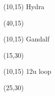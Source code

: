 \documentclass[11pt,a4paper]{beamer}
\begin{document}
\begin{frame}

  \begin{textblock}{60}(10,15)
    {\huge Hydra}
  \end{textblock}

  \begin{textblock}{20}(40,15)
  \end{textblock}
\end{frame}

\begin{frame}

  \begin{textblock}{60}(10,15)
    {\huge Gandalf}
  \end{textblock}

  \begin{textblock}{20}(15,30)
  \end{textblock}
\end{frame}

\begin{frame}
  \begin{textblock}{60}(10,15)
    {\huge 12u loop}
  \end{textblock}
  \begin{textblock}{20}(25,30)
  \end{textblock}
\end{frame}
\end{document}
